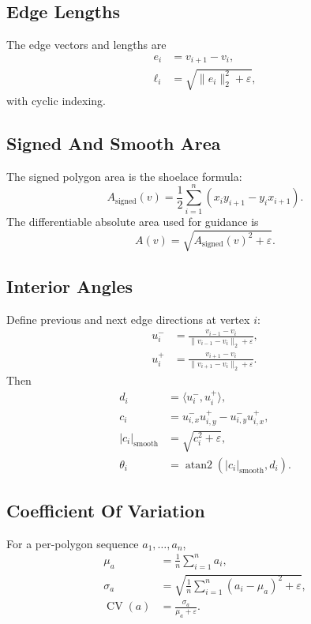 \documentclass[11pt]{article}
\newcommand{\CV}{\operatorname{CV}}
\begin{document}
\subsection{Edge Lengths}
The edge vectors and lengths are
\begin{align}
e_i &= v_{i+1} - v_i, \\
\ell_i &= \sqrt{\|e_i\|_2^2 + \varepsilon},
\end{align}
with cyclic indexing.

\subsection{Signed And Smooth Area}
The signed polygon area is the shoelace formula:
\begin{equation}
A_{\mathrm{signed}}(v)
=
\frac{1}{2}
\sum_{i=1}^n
\left(
x_i y_{i+1} - y_i x_{i+1}
\right).
\end{equation}
The differentiable absolute area used for guidance is
\begin{equation}
A(v) = \sqrt{A_{\mathrm{signed}}(v)^2 + \varepsilon}.
\end{equation}

\subsection{Interior Angles}
Define previous and next edge directions at vertex $i$:
\begin{align}
u_i^- &= \frac{v_{i-1} - v_i}{\|v_{i-1} - v_i\|_2 + \varepsilon}, \\
u_i^+ &= \frac{v_{i+1} - v_i}{\|v_{i+1} - v_i\|_2 + \varepsilon}.
\end{align}
Then
\begin{align}
d_i &= \langle u_i^-, u_i^+ \rangle, \\
c_i &= u_{i,x}^- u_{i,y}^+ - u_{i,y}^- u_{i,x}^+, \\
|c_i|_{\mathrm{smooth}} &= \sqrt{c_i^2 + \varepsilon}, \\
\theta_i &= \operatorname{atan2}\!\left(|c_i|_{\mathrm{smooth}}, d_i\right).
\end{align}

\subsection{Coefficient Of Variation}
For a per-polygon sequence $a_1,\dots,a_n$,
\begin{align}
\mu_a &= \frac{1}{n}\sum_{i=1}^n a_i, \\
\sigma_a &= \sqrt{\frac{1}{n}\sum_{i=1}^n (a_i - \mu_a)^2 + \varepsilon}, \\
\CV(a) &= \frac{\sigma_a}{\mu_a + \varepsilon}.
\end{align}
\end{document}
